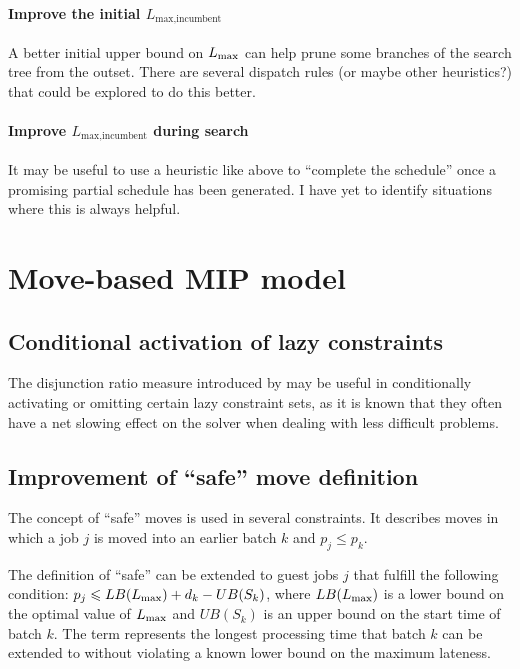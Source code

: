 \documentclass[13pt, letterpaper, oneside]{book}
\begin{document}
\paragraph{Improve the initial $L_{\text{max,incumbent}}$} A better initial
upper bound on $L_{\text{max}}$ can help prune some branches of the search tree from the
outset. There are several dispatch rules (or maybe other heuristics?) that could
be explored to do this better.
\paragraph{Improve $L_{\text{max,incumbent}}$ during search} It may be useful to
use a heuristic like above to ``complete the schedule'' once a promising partial
schedule has been generated. I have yet to identify situations where this is
always helpful.


\section{Move-based MIP model}
\subsection{Conditional activation of lazy constraints}
The disjunction ratio measure introduced by \citet{baptistelapape} may be useful
in conditionally activating or omitting certain lazy constraint sets, as it is
known that they often have a net slowing effect on the solver when dealing with
less difficult problems. 

\subsection{Improvement of ``safe'' move definition}
The concept of ``safe'' moves is used in several constraints. It describes moves
in which a job $j$ is moved into an earlier batch $k$ and $p_j \leq p_k$.

The definition of ``safe'' can be extended to guest jobs $j$ that fulfill the
following condition: $p_j \leqslant LB(L_{\text{max}}) + d_k - UB(S_k)$, where $LB(L_{\text{max}})$ is
a lower bound on the optimal value of $L_{\text{max}}$ and $UB(S_k)$ is an upper bound on
the start time of batch $k$. The term represents the longest processing time
that batch $k$ can be extended to without violating a known lower bound on the
maximum lateness.
\end{document}
